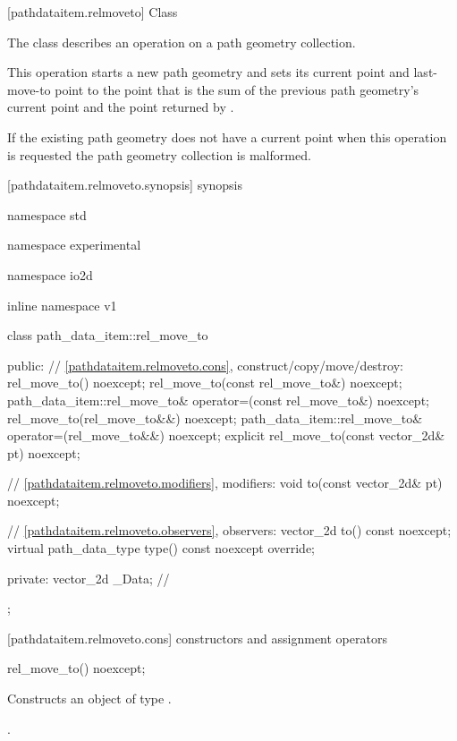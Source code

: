  [pathdataitem.relmoveto] {Class }

\pnum
{}
The class  describes an operation on a path geometry collection.

\pnum
This operation starts a new path geometry and sets its current point and last-move-to point to the point that is the sum of the previous path geometry's current point and the point returned by .

\pnum
If the existing path geometry does not have a current point when this operation is requested the path geometry collection is malformed.

 [pathdataitem.relmoveto.synopsis] { synopsis}

\begin{codeblock}
namespace std { namespace experimental { namespace io2d { inline namespace v1 {
  class path_data_item::rel_move_to {
  public:
    // \ref{pathdataitem.relmoveto.cons}, construct/copy/move/destroy:
    rel_move_to() noexcept;
    rel_move_to(const rel_move_to&) noexcept;
    path_data_item::rel_move_to& operator=(const rel_move_to&) noexcept;
    rel_move_to(rel_move_to&&) noexcept;
    path_data_item::rel_move_to& operator=(rel_move_to&&) noexcept;
    explicit rel_move_to(const vector_2d& pt) noexcept;

    // \ref{pathdataitem.relmoveto.modifiers}, modifiers:
    void to(const vector_2d& pt) noexcept;

    // \ref{pathdataitem.relmoveto.observers}, observers:
    vector_2d to() const noexcept;
    virtual path_data_type type() const noexcept override;
    
  private:
    vector_2d _Data; // \expos
  };
} } } }
\end{codeblock}

 [pathdataitem.relmoveto.cons] { constructors and assignment operators}

\begin{itemdecl}
    rel_move_to() noexcept;
\end{itemdecl}
\begin{itemdescr}
	\pnum
	\effects
	Constructs an object of type .
	
	\pnum
	\postconditions
	.
\end{itemdescr}

